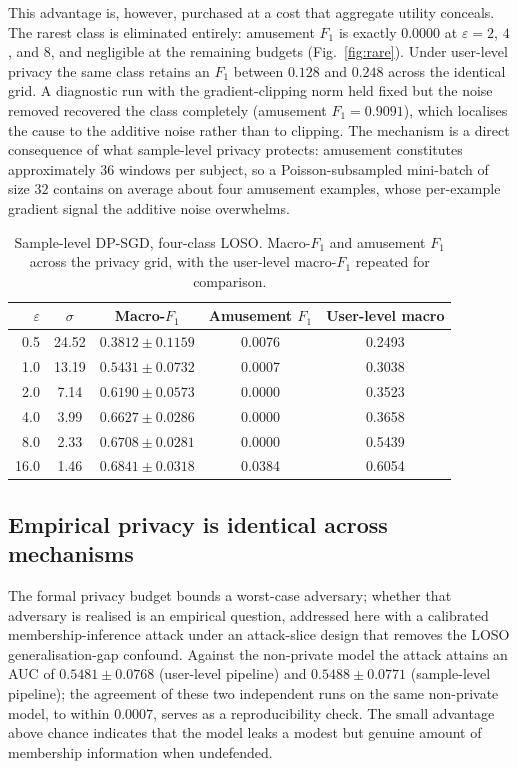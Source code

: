 This advantage is, however, purchased at a cost that aggregate utility conceals.
The rarest class is eliminated entirely: amusement $F_1$ is exactly $0.0000$ at
$\varepsilon = 2$, $4$, and $8$, and negligible at the remaining budgets
(Fig.~\ref{fig:rare}). Under user-level privacy the same class retains an $F_1$
between $0.128$ and $0.248$ across the identical grid. A diagnostic run with the
gradient-clipping norm held fixed but the noise removed recovered the class
completely (amusement $F_1 = 0.9091$), which localises the cause to the additive
noise rather than to clipping. The mechanism is a direct consequence of what
sample-level privacy protects: amusement constitutes approximately $36$ windows
per subject, so a Poisson-subsampled mini-batch of size $32$ contains on average
about four amusement examples, whose per-example gradient signal the additive
noise overwhelms.

\begin{table}[t]
\centering
\caption{Sample-level DP-SGD, four-class LOSO. Macro-$F_1$ and amusement $F_1$
across the privacy grid, with the user-level macro-$F_1$ repeated for
comparison.}
\label{tab:sample-dp}
\begin{tabular}{rcccc}
\toprule
$\varepsilon$ & $\sigma$ & Macro-$F_1$ & Amusement $F_1$ & User-level macro \\
\midrule
0.5  & 24.52 & $0.3812 \pm 0.1159$ & 0.0076 & 0.2493 \\
1.0  & 13.19 & $0.5431 \pm 0.0732$ & 0.0007 & 0.3038 \\
2.0  &  7.14 & $0.6190 \pm 0.0573$ & 0.0000 & 0.3523 \\
4.0  &  3.99 & $0.6627 \pm 0.0286$ & 0.0000 & 0.3658 \\
8.0  &  2.33 & $0.6708 \pm 0.0281$ & 0.0000 & 0.5439 \\
16.0 &  1.46 & $0.6841 \pm 0.0318$ & 0.0384 & 0.6054 \\
\bottomrule
\end{tabular}
\end{table}

\subsection{Empirical privacy is identical across mechanisms}
\label{sec:results-mia}

The formal privacy budget bounds a worst-case adversary; whether that adversary
is realised is an empirical question, addressed here with a calibrated
membership-inference attack under an attack-slice design that removes the
LOSO generalisation-gap confound. Against the non-private model the attack
attains an AUC of $0.5481 \pm 0.0768$ (user-level pipeline) and $0.5488 \pm
0.0771$ (sample-level pipeline); the agreement of these two independent runs on
the same non-private model, to within $0.0007$, serves as a reproducibility
check. The small advantage above chance indicates that the model leaks a modest
but genuine amount of membership information when undefended.

